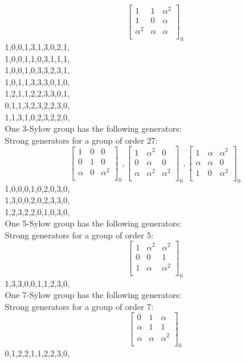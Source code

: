 $$
\left[
\begin{array}{*{3}{r}}
1 & 1 & \alpha^{2}\\
1 & 0 & \alpha \\
\alpha^{2} & \alpha  & \alpha \\
\end{array}
\right]
_{0}
$$
1,0,0,1,3,1,3,0,2,1,\\
1,0,0,1,1,0,3,1,1,1,\\
1,0,0,1,0,3,3,2,3,1,\\
1,0,1,1,3,3,3,0,1,0,\\
1,2,1,1,2,2,3,3,0,1,\\
0,1,1,3,2,3,2,2,3,0,\\
1,1,3,1,0,2,3,2,2,0,\\
One 3-Sylow group has the following generators:\\
Strong generators for a group of order 27:
$$
\left[
\begin{array}{*{3}{r}}
1 & 0 & 0\\
0 & 1 & 0\\
\alpha  & 0 & \alpha^{2}\\
\end{array}
\right]
_{0}
, 
\left[
\begin{array}{*{3}{r}}
1 & \alpha^{2} & 0\\
0 & \alpha  & 0\\
\alpha  & \alpha^{2} & \alpha^{2}\\
\end{array}
\right]
_{0}
, 
\left[
\begin{array}{*{3}{r}}
1 & \alpha  & \alpha^{2}\\
\alpha  & \alpha  & 0\\
1 & 0 & \alpha^{2}\\
\end{array}
\right]
_{0}
$$
1,0,0,0,1,0,2,0,3,0,\\
1,3,0,0,2,0,2,3,3,0,\\
1,2,3,2,2,0,1,0,3,0,\\
One 5-Sylow group has the following generators:\\
Strong generators for a group of order 5:
$$
\left[
\begin{array}{*{3}{r}}
1 & \alpha^{2} & \alpha^{2}\\
0 & 0 & 1\\
1 & \alpha  & \alpha^{2}\\
\end{array}
\right]
_{0}
$$
1,3,3,0,0,1,1,2,3,0,\\
One 7-Sylow group has the following generators:\\
Strong generators for a group of order 7:
$$
\left[
\begin{array}{*{3}{r}}
0 & 1 & \alpha \\
\alpha  & 1 & 1\\
\alpha  & \alpha  & \alpha^{2}\\
\end{array}
\right]
_{0}
$$
0,1,2,2,1,1,2,2,3,0,\\
